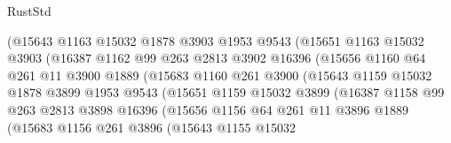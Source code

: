 \begin{lexlean}{RustStd}
\begin{coremodule}
                          (@15643
                            @1163
                            @15032
                            @1878
                            @3903
                            @1953
                            @9543
                            (@15651
                              @1163
                              @15032
                              @3903
                              (@16387
                                @1162
                                @99
                                @263
                                @2813
                                @3902
                                @16396
                                (@15656
                                  @1160
                                  @64
                                  @261
                                  @11
                                  @3900
                                  @1889
                                  (@15683
                                    @1160
                                    @261
                                    @3900
                                    (@15643
                                      @1159
                                      @15032
                                      @1878
                                      @3899
                                      @1953
                                      @9543
                                      (@15651
                                        @1159
                                        @15032
                                        @3899
                                        (@16387
                                          @1158
                                          @99
                                          @263
                                          @2813
                                          @3898
                                          @16396
                                          (@15656
                                            @1156
                                            @64
                                            @261
                                            @11
                                            @3896
                                            @1889
                                            (@15683
                                              @1156
                                              @261
                                              @3896
                                              (@15643
                                                @1155
                                                @15032

\end{coremodule}
\end{lexlean}

